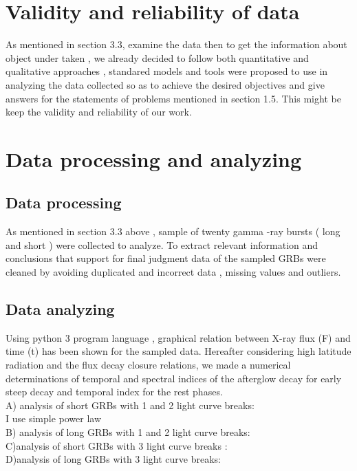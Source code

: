 \section{Validity and reliability of data }
 As mentioned in section 3.3, examine the data then to get the information about object under taken , we already decided to follow both quantitative and qualitative approaches , standared models and tools were  proposed  to use in analyzing the data collected so as to achieve the desired  objectives and give answers  for the  statements of problems mentioned in section 1.5. This might be  keep the validity and reliability of our work.
\section{Data processing and analyzing} 
\subsection{Data processing }
As mentioned in section 3.3 above , sample of  twenty  gamma -ray bursts ( long and short ) were collected to  analyze. To extract relevant information and conclusions  that support for final  judgment  data of the sampled  GRBs  were cleaned by avoiding  duplicated  and incorrect data , missing values and outliers.  
\subsection{Data analyzing}
Using python 3 program language , graphical relation between X-ray  flux (F)  and time (t) has been shown for the sampled  data. Hereafter considering high latitude radiation and the flux decay closure relations, we made a numerical determinations
of temporal and spectral indices of the afterglow decay for early steep decay and temporal index for the rest phases.\\
A) analysis of short GRBs with 1  and  2 light curve breaks:\\
I use simple power law \\
B) analysis of long GRBs with 1  and  2 light curve breaks:\\
C)analysis of short GRBs with 3 light curve breaks :\\
D)analysis of long GRBs with 3 light curve breaks:\\
